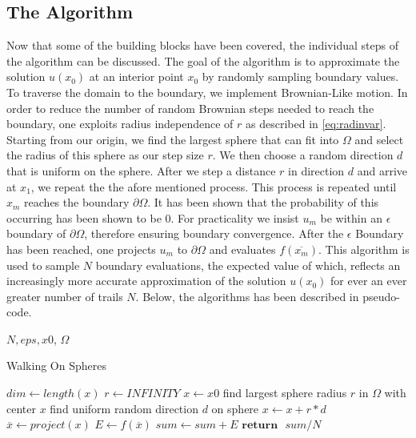 \subsection{The Algorithm}\label{sssec:algorithm} %
Now that some of the building blocks have been covered, the individual steps of
the algorithm can be discussed.  The goal of the algorithm is to approximate
the solution $u(x_{0})$ at an interior point $x_{0}$ by randomly sampling boundary
values.  To traverse the domain  to the boundary, we implement Brownian-Like motion.
In order to reduce the number of random Brownian steps needed to reach the boundary,
one exploits radius independence of $r$ as described in \ref{eq:radinvar}.  Starting
from our origin, we find the largest sphere that can fit into $\Omega$ %
and select the radius of this sphere as our step size $r$.  We then choose a random direction $d$
that is uniform on the sphere. %
After we step a distance $r$ in direction $d$ and arrive at $x_{1}$, we repeat the the afore mentioned process.
This process is repeated until $x_{m}$ reaches the boundary $\partial \Omega$.
It has been shown that the probability of this occurring has been shown to be 0\cite{kakutani1944}. %
 For practicality we insist $u_{m}$ be within an $\epsilon$ boundary of $\partial \Omega$,
 therefore ensuring boundary convergence.  After the $\epsilon$ Boundary has been reached,
 one projects $u_{m}$ to $\partial \Omega$ and evaluates $f(\overline{x_{m}})$.
This algorithm is used to sample $N$ boundary evaluations, the expected value of which,
reflects an increasingly more accurate approximation of the solution $u(x_{0})$
for ever an ever greater number of trails $N$\cite{Bornemann,DeLaurentis}.  Below, the algorithms has been
described in pseudo-code.


 \begin{algorithm}[H]{$N, eps, x0$, $\Omega$}
  \caption{Walking On Spheres}
 \label{alg:wos}
\begin{algorithmic}[1]
   \State $dim \gets length(x)$ 
   \State $ r \gets INFINITY$
   \label{lst:line:for}
   \State $x \leftarrow x0$
      \State find largest sphere radius $r$ in $\Omega$ with center $x$ \label{lst:line:radius}
      \State find uniform random direction $d$ on sphere \label{lst:line:direction}
      \State $ x \gets x + r * d$ 
 \EndWhile
 \State $\overline x \gets project(x)$ 
 \State $E \gets f(\overline x)$ 
 \State $sum \gets sum + E$  \label{lst:line:reduce}
  \EndFor
 \State $\textbf{return} \text{ } sum / N$ 

\end{algorithmic}
\end{algorithm}

